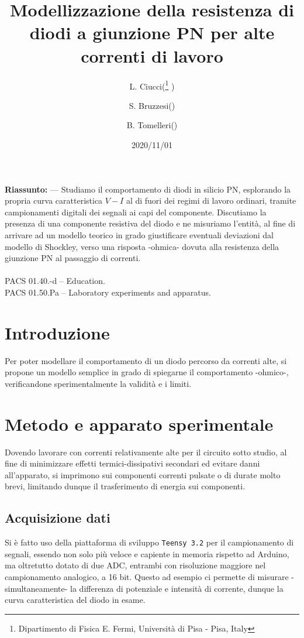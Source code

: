 \documentclass{article}[a4paper, oneside ,11pt]
\title{Modellizzazione della resistenza di diodi a giunzione PN per alte correnti di lavoro}
\author{L. Ciucci(\thanks{Dipartimento di Fisica E. Fermi, Universit\`a di Pisa - Pisa, Italy} ) \and S. Bruzzesi(\protect\footnotemark[1] ) \and B. Tomelleri(\protect\footnotemark[1] )}
\date{2020/11/01}
\begin{document}
\maketitle

\begin{mdframed}
\textbf{Riassunto:} --- Studiamo il comportamento di diodi in silicio PN, esplorando la propria curva caratteristica $V - I$ al di fuori dei regimi di lavoro ordinari, tramite campionamenti digitali dei segnali ai capi del componente. Discutiamo la presenza di una componente resistiva del diodo e ne misuriamo l'entità, al fine di arrivare ad un modello teorico in grado giustificare eventuali deviazioni dal modello di Shockley, verso una risposta -ohmica- dovuta alla resistenza della giunzione PN al passaggio di correnti.\\\\
PACS 01.40.-d – Education.\\
PACS 01.50.Pa – Laboratory experiments and apparatus.
\end{mdframed}

\section{Introduzione}
Per poter modellare il comportamento di un diodo percorso da correnti alte, si propone un modello semplice in grado di spiegarne il comportamento -ohmico-, verificandone sperimentalmente la validità e i limiti.
\section{Metodo e apparato sperimentale}
Dovendo lavorare con correnti relativamente alte per il circuito sotto studio, al fine di minimizzare effetti termici-dissipativi secondari ed evitare danni all'apparato, si imprimono sui componenti correnti pulsate o di durate molto brevi, limitando dunque il trasferimento di energia sui componenti.
\subsection{Acquisizione dati}
Si è fatto uso della piattaforma di sviluppo \verb+Teensy 3.2+\cite{teensy} per il campionamento di segnali, essendo non solo più veloce e capiente in memoria rispetto ad Arduino, ma oltretutto dotato di due ADC, entrambi con risoluzione maggiore nel campionamento analogico, a 16 bit. Questo ad esempio ci permette di misurare -simultaneamente- la differenza di potenziale e intensità di corrente, dunque la curva caratteristica del diodo in esame. 
\end{document}
